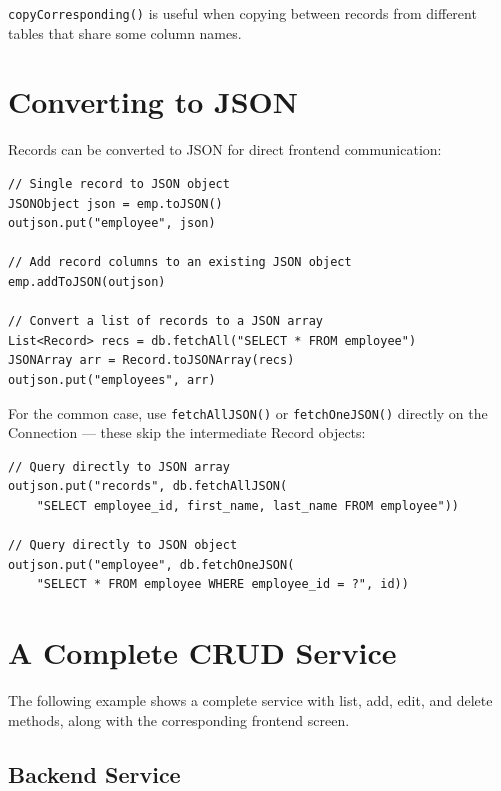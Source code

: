 \noindent
\texttt{copyCorresponding()} is useful when copying between records from different tables that share some column names.

\section{Converting to JSON}
\label{sec:crud-json}

Records can be converted to JSON for direct frontend communication:

\begin{lstlisting}[style=groovy]
// Single record to JSON object
JSONObject json = emp.toJSON()
outjson.put("employee", json)

// Add record columns to an existing JSON object
emp.addToJSON(outjson)

// Convert a list of records to a JSON array
List<Record> recs = db.fetchAll("SELECT * FROM employee")
JSONArray arr = Record.toJSONArray(recs)
outjson.put("employees", arr)
\end{lstlisting}

\noindent
For the common case, use \texttt{fetchAllJSON()} or \texttt{fetchOneJSON()} directly on the Connection --- these skip the intermediate Record objects:

\begin{lstlisting}[style=groovy]
// Query directly to JSON array
outjson.put("records", db.fetchAllJSON(
    "SELECT employee_id, first_name, last_name FROM employee"))

// Query directly to JSON object
outjson.put("employee", db.fetchOneJSON(
    "SELECT * FROM employee WHERE employee_id = ?", id))
\end{lstlisting}

\section{A Complete CRUD Service}
\label{sec:crud-example}

The following example shows a complete service with list, add, edit, and delete methods, along with the corresponding frontend screen.

\subsection{Backend Service}

